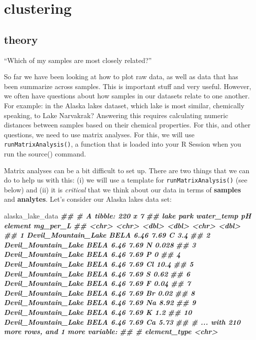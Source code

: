 \documentclass[
]{krantz}
\newenvironment{Shaded}{\begin{snugshade}}{\end{snugshade}}
\newcommand{\DocumentationTok}[1]{\textcolor[rgb]{0.56,0.35,0.01}{\textbf{\textit{#1}}}}
\newcommand{\NormalTok}[1]{#1}
\begin{document}
\hypertarget{clustering}{%
\section{clustering}\label{clustering}}

\hypertarget{theory}{%
\subsection{theory}\label{theory}}

``Which of my samples are most closely related?''

So far we have been looking at how to plot raw data, as well as data that has been summarize across samples. This is important stuff and very useful. However, we often have questions about how samples in our datasets relate to one another. For example: in the Alaska lakes dataset, which lake is most similar, chemically speaking, to Lake Narvakrak? Answering this requires calculating numeric distances between samples based on their chemical properties. For this, and other questions, we need to use matrix analyses. For this, we will use \texttt{runMatrixAnalysis()}, a function that is loaded into your R Session when you run the source() command.

Matrix analyses can be a bit difficult to set up. There are two things that we can do to help us with this: (i) we will use a template for \texttt{runMatrixAnalysis()} (see below) and (ii) it is \emph{critical} that we think about our data in terms of \textbf{samples} and \textbf{analytes}. Let's consider our Alaska lakes data set:

\begin{Shaded}
\begin{Highlighting}[]
\NormalTok{alaska\_lake\_data}
\DocumentationTok{\#\# \# A tibble: 220 x 7}
\DocumentationTok{\#\#    lake                park  water\_temp    pH element mg\_per\_L}
\DocumentationTok{\#\#    \textless{}chr\textgreater{}               \textless{}chr\textgreater{}      \textless{}dbl\textgreater{} \textless{}dbl\textgreater{} \textless{}chr\textgreater{}      \textless{}dbl\textgreater{}}
\DocumentationTok{\#\#  1 Devil\_Mountain\_Lake BELA        6.46  7.69 C          3.4  }
\DocumentationTok{\#\#  2 Devil\_Mountain\_Lake BELA        6.46  7.69 N          0.028}
\DocumentationTok{\#\#  3 Devil\_Mountain\_Lake BELA        6.46  7.69 P          0    }
\DocumentationTok{\#\#  4 Devil\_Mountain\_Lake BELA        6.46  7.69 Cl        10.4  }
\DocumentationTok{\#\#  5 Devil\_Mountain\_Lake BELA        6.46  7.69 S          0.62 }
\DocumentationTok{\#\#  6 Devil\_Mountain\_Lake BELA        6.46  7.69 F          0.04 }
\DocumentationTok{\#\#  7 Devil\_Mountain\_Lake BELA        6.46  7.69 Br         0.02 }
\DocumentationTok{\#\#  8 Devil\_Mountain\_Lake BELA        6.46  7.69 Na         8.92 }
\DocumentationTok{\#\#  9 Devil\_Mountain\_Lake BELA        6.46  7.69 K          1.2  }
\DocumentationTok{\#\# 10 Devil\_Mountain\_Lake BELA        6.46  7.69 Ca         5.73 }
\DocumentationTok{\#\# \# ... with 210 more rows, and 1 more variable:}
\DocumentationTok{\#\# \#   element\_type \textless{}chr\textgreater{}}
\end{Highlighting}
\end{Shaded}
\end{document}
